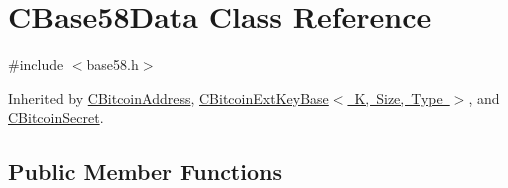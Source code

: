\hypertarget{class_c_base58_data}{}\section{C\+Base58\+Data Class Reference}
\label{class_c_base58_data}


{\ttfamily \#include $<$base58.\+h$>$}



Inherited by \mbox{\hyperlink{class_c_bitcoin_address}{C\+Bitcoin\+Address}}, \mbox{\hyperlink{class_c_bitcoin_ext_key_base}{C\+Bitcoin\+Ext\+Key\+Base$<$ K, Size, Type $>$}}, and \mbox{\hyperlink{class_c_bitcoin_secret}{C\+Bitcoin\+Secret}}.

\subsection*{Public Member Functions}
